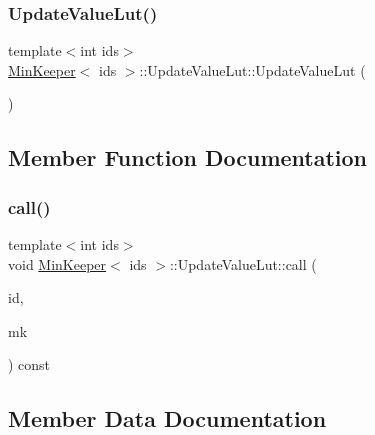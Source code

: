 \subsubsection{\texorpdfstring{Update\+Value\+Lut()}{UpdateValueLut()}}
{\footnotesize\ttfamily template$<$int ids$>$ \\
\hyperlink{classMinKeeper}{Min\+Keeper}$<$ ids $>$\+::Update\+Value\+Lut\+::\+Update\+Value\+Lut (\begin{DoxyParamCaption}{ }\end{DoxyParamCaption})\hspace{0.3cm}{\ttfamily [inline]}}



\subsection{Member Function Documentation}
\mbox{\label{classMinKeeper_1_1UpdateValueLut_ab8897ae5eca6cab87607eea12e90f3c5}} 
\subsubsection{\texorpdfstring{call()}{call()}}
{\footnotesize\ttfamily template$<$int ids$>$ \\
void \hyperlink{classMinKeeper}{Min\+Keeper}$<$ ids $>$\+::Update\+Value\+Lut\+::call (\begin{DoxyParamCaption}\item[{\hyperlink{ioapi_8h_a787fa3cf048117ba7123753c1e74fcd6}{int}}]{id,  }\item[{\hyperlink{classMinKeeper}{Min\+Keeper}$<$ ids $>$ \&}]{mk }\end{DoxyParamCaption}) const\hspace{0.3cm}{\ttfamily [inline]}}



\subsection{Member Data Documentation}
\mbox{\label{classMinKeeper_1_1UpdateValueLut_a4d69b64613b84dea77264ef5f8947ce5}} 
